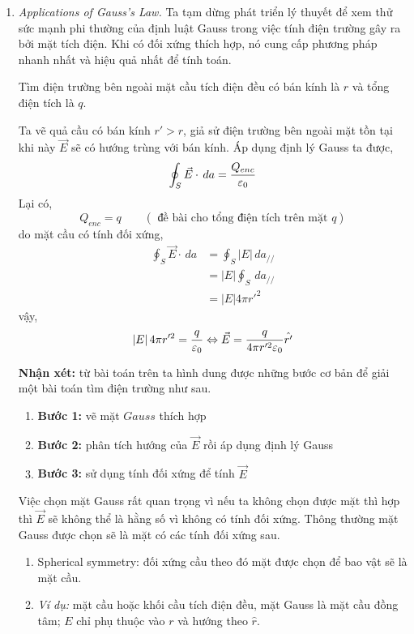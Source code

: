 \begin{enumerate}
\item \textit{Applications of Gauss's Law.}
Ta tạm dừng phát triển lý thuyết để xem thử sức mạnh phi thường của định luật Gauss trong việc tính điện trường gây ra bởi mặt tích điện. Khi có đối xứng thích hợp, nó cung cấp phương pháp nhanh nhất và hiệu quả nhất để tính toán.
\begin{problem}
Tìm điện trường bên ngoài mặt cầu tích điện đều có bán kính là $r$ và tổng điện tích là $q$.
\end{problem}
\begin{sol}
Ta vẽ quả cầu có bán kính $r' > r$, giả sử điện trường bên ngoài mặt tồn tại khi này $\vec{E}$ sẽ có hướng trùng với bán kính. Áp dụng định lý Gauss ta được,
\[
\oint_{S} \vec{E} \cdot \, da =  \frac{Q_{enc}}{\varepsilon_{0}}
\]
Lại có,
\[
Q_{enc} = q \qquad (\text{ đề bài cho tổng điện tích trên mặt $q$})
\]
do mặt cầu có tính đối xứng,
\begin{align*}
\oint_{S} \vec{E} \cdot \, da &=  \oint_{S} \left| E \right|  \, da_{//} \\[6pt]
&= \left| E \right| \oint_{S}  \, da_{//} \\[6pt]
&= \left| E \right| 4\pi r'^{2}
\end{align*}
vậy,
\[
\left| E \right| 4\pi r'^{2} = \frac{q}{\varepsilon_{0}} \Leftrightarrow \vec{E} = \frac{q}{4 \pi r'^{2} \varepsilon_{0}}\hat{r'}
\]
\end{sol}
\textbf{Nhận xét:} từ bài toán trên ta hình dung được những bước cơ bản để giải một bài toán tìm điện trường như sau.
\begin{enumerate}[label={}]
    \item \textbf{Bước 1:} vẽ mặt $Gauss$ thích hợp
    \item \textbf{Bước 2:} phân tích hướng của $\vec{E}$ rồi áp dụng định lý Gauss
    \item \textbf{Bước 3:} sử dụng tính đối xứng để tính $\vec{E}$
\end{enumerate}
Việc chọn mặt Gauss rất quan trọng vì nếu ta không chọn được mặt thì hợp thì $\vec{E}$ sẽ không thể là hằng số vì không có tính đối xứng. Thông thường mặt Gauss được chọn sẽ là mặt có các tính đối xứng sau.
\begin{enumerate}[label={}]
\item{Spherical symmetry:} đối xứng cầu theo đó mặt được chọn để bao vật sẽ là mặt cầu.
\item \textit{Ví dụ:} mặt cầu hoặc khối cầu tích điện đều, mặt Gauss là mặt cầu đồng tâm; $E$ chỉ phụ thuộc vào $r$ và hướng theo $\hat{r}$.

\end{enumerate}
\end{enumerate}
